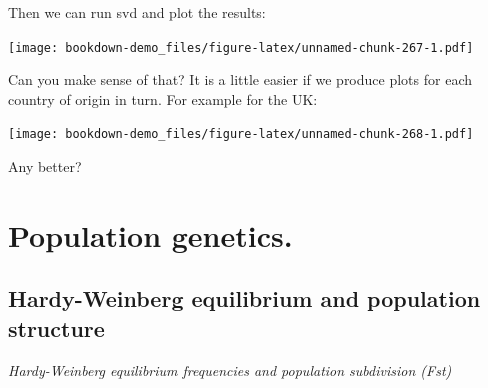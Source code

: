 \documentclass[
]{book}
\newenvironment{Shaded}{\begin{snugshade}}{\end{snugshade}}
\newcommand{\AttributeTok}[1]{\textcolor[rgb]{0.77,0.63,0.00}{#1}}
\newcommand{\DecValTok}[1]{\textcolor[rgb]{0.00,0.00,0.81}{#1}}
\newcommand{\FloatTok}[1]{\textcolor[rgb]{0.00,0.00,0.81}{#1}}
\newcommand{\FunctionTok}[1]{\textcolor[rgb]{0.00,0.00,0.00}{#1}}
\newcommand{\NormalTok}[1]{#1}
\newcommand{\OtherTok}[1]{\textcolor[rgb]{0.56,0.35,0.01}{#1}}
\newcommand{\SpecialCharTok}[1]{\textcolor[rgb]{0.00,0.00,0.00}{#1}}
\newcommand{\StringTok}[1]{\textcolor[rgb]{0.31,0.60,0.02}{#1}}
\begin{document}
Then we can run svd and plot the results:

\begin{Shaded}
\end{Shaded}

\texttt{[image: bookdown-demo\_files/figure-latex/unnamed-chunk-267-1.pdf]}

Can you make sense of that? It is a little easier if we produce plots for each country of origin in turn. For example for the UK:

\begin{Shaded}
\end{Shaded}

\texttt{[image: bookdown-demo\_files/figure-latex/unnamed-chunk-268-1.pdf]}

Any better?

\hypertarget{Population-genetics}{%
\chapter{Population genetics.}\label{Population-genetics}}

\hypertarget{hardy-weinberg-equilibrium-and-population-structure}{%
\section{Hardy-Weinberg equilibrium and population structure}\label{hardy-weinberg-equilibrium-and-population-structure}}

\emph{Hardy-Weinberg equilibrium frequencies and population subdivision (Fst)}
\end{document}
